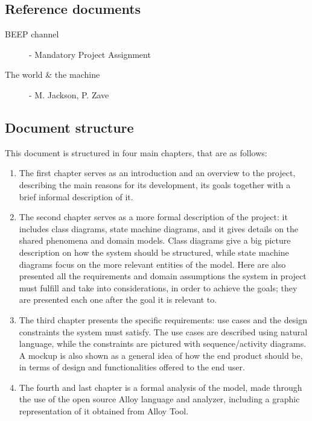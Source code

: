 \subsection{Reference documents}
{\todo
\begin{minipage}{\textwidth}
    \begin{description}
        \item [BEEP channel] - Mandatory Project Assignment
        \item [The world \& the machine] - M. Jackson, P. Zave
    \end{description}
    \end{minipage}
}
\subsection{Document structure}
This document is structured in four main chapters, that are as follows:
\begin{enumerate}
	\item The first chapter serves as an introduction and an overview to the project, describing the main reasons for its development, its goals together with a brief informal description of it.

	\item The second chapter serves as a more formal description of the project: it includes class diagrams, state machine diagrams, and it gives details on the shared phenomena and domain models. Class diagrams give a big picture description on how the system should be structured, while state machine diagrams focus on the more relevant entities of the model. Here are also presented all the requirements and domain assumptions the system in project must fulfill and take into considerations, in order to achieve the goals; they are presented each one after the goal it is relevant to.

	\item The third chapter presents the specific requirements: use cases and the design constraints the system must satisfy. The use cases are described using natural language, while the constraints are pictured with sequence/activity diagrams. A mockup is also shown as a general idea of how the end product should be, in terms of design and functionalities offered to the end user.

	\item The fourth and last chapter is a formal analysis of the model, made through the use of the open source Alloy language and analyzer, including a graphic representation of it obtained from Alloy Tool.
\end{enumerate}
